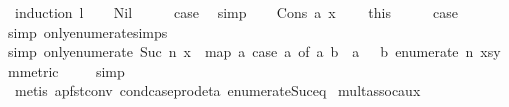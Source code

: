 \begin{isabellebody}
%
\isadelimproof
%
\endisadelimproof
%
\isatagproof
{}\isamarkupfalse%
\ {\isacharparenleft}{\kern0pt}induction\ {\isacartoucheopen}l{\isacartoucheclose}{\isacharparenright}{\kern0pt}\isanewline
\ \ \isamarkupfalse%
\ Nil\isanewline
\ \ \isamarkupfalse%
\ \isamarkupfalse%
\ {\isacharquery}{\kern0pt}case\ \isamarkupfalse%
\ simp\isanewline
{}\isamarkupfalse%
\isanewline
\ \ \isamarkupfalse%
\ {\isacharparenleft}{\kern0pt}Cons\ a\ x{\isacharparenright}{\kern0pt}\ \isamarkupfalse%
\ {\isacharasterisk}{\kern0pt}\ {\isacharequal}{\kern0pt}\ this\isanewline
\ \ \isamarkupfalse%
\ \isamarkupfalse%
\ {\isacharquery}{\kern0pt}case\ \isamarkupfalse%
{\isacharparenleft}{\kern0pt}simp\ only{\isacharcolon}{\kern0pt}enumerate{\isacharunderscore}{\kern0pt}simps{\isacharparenright}{\kern0pt}\isanewline
\ \ \ \ \isanewline
\ \ \ \ \isamarkupfalse%
{\isacharparenleft}{\kern0pt}simp\ only{\isacharcolon}{\kern0pt}{\isacartoucheopen}enumerate\ {\isacharparenleft}{\kern0pt}Suc\ n{\isacharparenright}{\kern0pt}\ x\ {\isacharequal}{\kern0pt}\ map\ {\isacharparenleft}{\kern0pt}{\isasymlambda}a{\isachardot}{\kern0pt}\ case\ a\ of\ {\isacharparenleft}{\kern0pt}a{\isacharcomma}{\kern0pt}\ b{\isacharparenright}{\kern0pt}\ {\isasymRightarrow}\ {\isacharparenleft}{\kern0pt}a\ {\isacharplus}{\kern0pt}\ {}{\isacharcomma}{\kern0pt}\ b{\isacharparenright}{\kern0pt}{\isacharparenright}{\kern0pt}\ {\isacharparenleft}{\kern0pt}enumerate\ n\ x{\isacharparenright}{\kern0pt}{\isacartoucheclose}{\isacharbrackleft}{\kern0pt}symmetric{\isacharbrackright}{\kern0pt}{\isacharparenright}{\kern0pt}\isanewline
\ \ \ \ \isamarkupfalse%
{\isacharparenleft}{\kern0pt}simp{\isacharparenright}{\kern0pt}\isanewline
\ \ \ \ \isamarkupfalse%
\ {\isacharasterisk}{\kern0pt}\isanewline
\ \ \ \ \isamarkupfalse%
\ {\isacharparenleft}{\kern0pt}metis\ apfst{\isacharunderscore}{\kern0pt}conv\ cond{\isacharunderscore}{\kern0pt}case{\isacharunderscore}{\kern0pt}prod{\isacharunderscore}{\kern0pt}eta\ enumerate{\isacharunderscore}{\kern0pt}Suc{\isacharunderscore}{\kern0pt}eq{\isacharparenright}{\kern0pt}\isanewline
{}\isamarkupfalse%
%
\endisatagproof
{\isafoldproof}%
%
\isadelimproof
\isanewline
%
\endisadelimproof
\isanewline
{}\isamarkupfalse%
\ mult{\isacharunderscore}{\kern0pt}assoc{\isacharunderscore}{\kern0pt}aux{}{\isacharcolon}{\kern0pt}\ \isanewline

\end{isabellebody}
